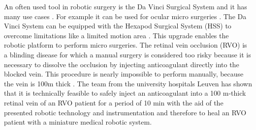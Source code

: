 \newpage
An often used tool in robotic surgery is the Da Vinci Surgical System and it has many use cases \cite{davinci}. For example it can be used for ocular micro surgeries \cite{davinciOcularSurgery}. The Da Vinci System can be equipped with the Hexapod Surgical System (HSS) to overcome limitations like a limited motion area \cite{davinciWithHSS}. This upgrade enables the robotic platform to perform micro surgeries. 
The retinal vein occlusion (RVO) is a blinding disease for which a manual surgery is considered too risky because it is necessary to dissolve the occlusion by injecting anticoagulant directly into the blocked vein. This procedure is nearly impossible to perform manually, because the vein is 100\textmu m thick \cite{veincannulation}. The team from the university hospitals Leuven has shown that it is technically \grqq  feasible to safely inject an anticoagulant into a 100 \textmu m-thick retinal vein of an RVO patient for a period of 10 min with the aid of the presented robotic technology and instrumentation\grqq \cite{veincannulation} and therefore to heal an RVO patient with a miniature medical robotic system.

